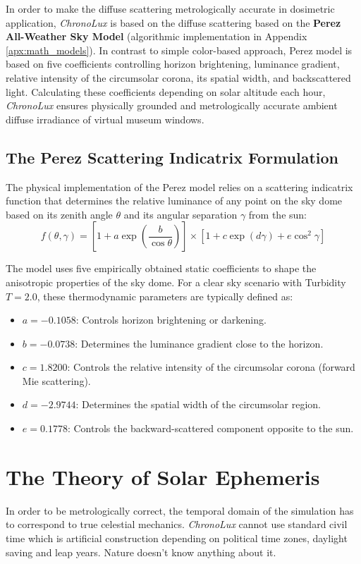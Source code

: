 In order to make the diffuse scattering metrologically accurate in dosimetric application, \textit{ChronoLux} is based on the diffuse scattering based on the \textbf{Perez All-Weather Sky Model} \cite{perez1993all} (algorithmic implementation in Appendix \ref{apx:math_models}). In contrast to simple color-based approach, Perez model is based on five coefficients controlling horizon brightening, luminance gradient, relative intensity of the circumsolar corona, its spatial width, and backscattered light. Calculating these coefficients depending on solar altitude each hour, \textit{ChronoLux} ensures physically grounded and metrologically accurate ambient diffuse irradiance of virtual museum windows.

\subsection{The Perez Scattering Indicatrix Formulation}
The physical implementation of the Perez model relies on a scattering indicatrix function that determines the relative luminance of any point on the sky dome based on its zenith angle $\theta$ and its angular separation $\gamma$ from the sun:
\begin{equation}
    f(\theta, \gamma) = \left[1 + a \exp\left(\frac{b}{\cos\theta}\right)\right] \times \left[1 + c \exp(d \gamma) + e \cos^2\gamma\right]
\end{equation}

The model uses five empirically obtained static coefficients to shape the anisotropic properties of the sky dome. For a clear sky scenario with Turbidity $T = 2.0$, these thermodynamic parameters are typically defined as:
\begin{itemize}
    \item $a = -0.1058$: Controls horizon brightening or darkening.
    \item $b = -0.0738$: Determines the luminance gradient close to the horizon.
    \item $c = 1.8200$: Controls the relative intensity of the circumsolar corona (forward Mie scattering).
    \item $d = -2.9744$: Determines the spatial width of the circumsolar region.
    \item $e = 0.1778$: Controls the backward-scattered component opposite to the sun.
\end{itemize}

\section{The Theory of Solar Ephemeris}
In order to be metrologically correct, the temporal domain of the simulation has to correspond to true celestial mechanics. \textit{ChronoLux} cannot use standard civil time which is artificial construction depending on political time zones, daylight saving and leap years. Nature doesn't know anything about it.

